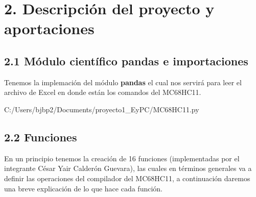 \documentclass[letterpaper]{report}
\begin{document}
    \section*{2. Descripci\'on del proyecto y aportaciones}
    \subsection*{2.1 M\'odulo cient\'ifico pandas e importaciones}
    Tenemos la implemaci\'on del módulo \textbf{pandas} el cual nos servir\'a
    para leer el archivo de Excel en donde est\'an los comandos del MC68HC11.
    
    {C:/Users/bjbp2/Documents/proyecto1_EyPC/MC68HC11.py}

    \subsection*{2.2 Funciones}
    En un principio tenemos la creación de 16 funciones (implementadas por el integrante 
    C\'esar Yair Calder\'on Guevara), las cuales en t\'erminos generales va a
    definir las operaciones del compilador del MC68HC11, a continuación daremos
    una breve explicaci\'on de lo que hace cada funci\'on.
\end{document}
